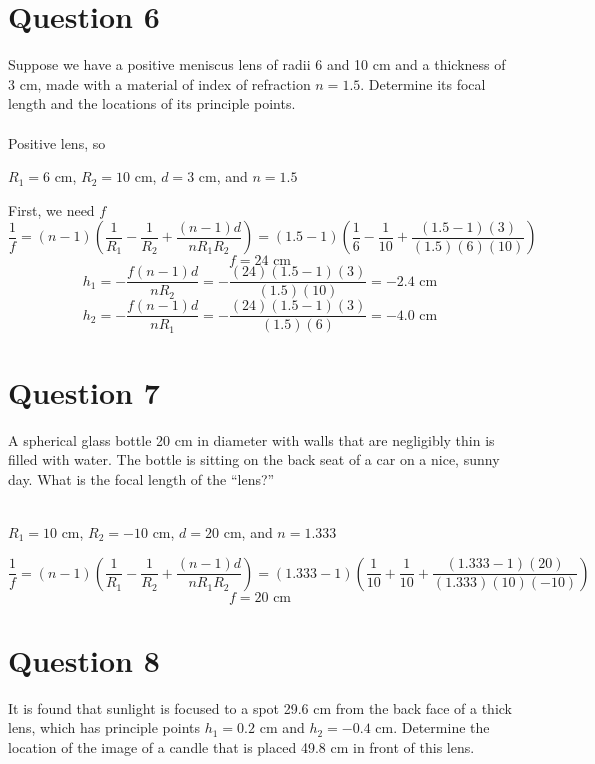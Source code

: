 \documentclass[a4paper]{article}
\begin{document}
\newpage
\section*{Question 6}
Suppose we have a positive meniscus lens of radii 6 and 10 cm and a thickness of 3 cm, made with
a material of index of refraction $n = 1.5$. Determine its focal length and the locations of its principle
points.\\\\

Positive lens, so
\begin{center}
    $R_1 = 6$ cm, $R_2 = 10$ cm, $d = 3$ cm, and $n = 1.5$
\end{center}
First, we need $f$
$$ \frac{1}{f} = (n - 1) \left(\frac{1}{R_1} - \frac{1}{R_2} + \frac{(n-1)d}{nR_1 R_2}\right) = (1.5 - 1) \left(\frac{1}{6} - \frac{1}{10} + \frac{(1.5-1)(3)}{(1.5)(6)(10)}\right)$$
$$ f = 24 \textrm{ cm} $$
$$ h_1 = - \frac{f(n-1)d}{nR_2} = - \frac{(24)(1.5-1)(3)}{(1.5)(10)} = -2.4 \textrm{ cm}$$
$$ h_2 = - \frac{f(n-1)d}{nR_1} = - \frac{(24)(1.5-1)(3)}{(1.5)(6)} = -4.0 \textrm{ cm}$$

\section*{Question 7}
A spherical glass bottle 20 cm in diameter with walls that are negligibly thin is filled with water.
The bottle is sitting on the back seat of a car on a nice, sunny day. What is the focal length of the
“lens?”\\\\

\begin{center}
    $R_1=10$ cm, $R_2=-10$ cm, $d = 20$ cm, and $n = 1.333$
\end{center}
$$ \frac{1}{f} = (n - 1) \left(\frac{1}{R_1} - \frac{1}{R_2} + \frac{(n-1)d}{nR_1 R_2}\right) = (1.333 - 1) \left(\frac{1}{10} + \frac{1}{10} + \frac{(1.333-1)(20)}{(1.333)(10)(-10)}\right)$$
$$ f = 20 \textrm{ cm}$$

\newpage
\section*{Question 8}
It is found that sunlight is focused to a spot 29.6 cm from the back face of a thick lens, which has
principle points $h_1 = 0.2$ cm and $h_2 = -0.4$ cm. Determine the location of the image of a candle that
is placed 49.8 cm in front of this lens.\\\\
\end{document}
